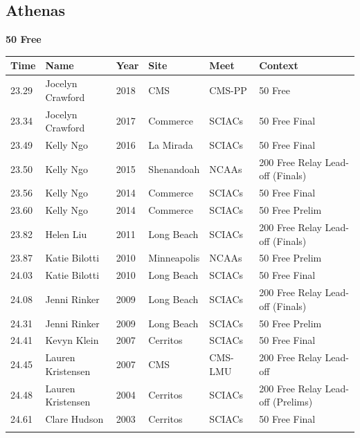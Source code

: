 
\clearpage
{}

\clearpage
\subsection{Athenas}
\vspace{2.0em}
\noindent\begin{minipage}[t]{0.98\textwidth}
\centering
\textbf{\textcolor{teamprimary}{50 Free}}\par
\vspace{0.5em}
\centering
\small
\renewcommand{\arraystretch}{1.0}
\setlength{\tabcolsep}{4pt}
\begin{tabular}{@{}p{2.0cm}p{3.2cm}p{1.2cm}p{2.0cm}p{2.0cm}p{2.5cm}@{}}
\toprule
\textbf{Time} & \textbf{Name} & \textbf{Year} & \textbf{Site} & \textbf{Meet} & \textbf{Context} \\
\midrule
23.29 & Jocelyn Crawford & 2018 & CMS & CMS-PP & 50 Free \\
23.34 & Jocelyn Crawford & 2017 & Commerce & SCIACs & 50 Free Final \\
23.49 & Kelly Ngo & 2016 & La Mirada & SCIACs & 50 Free Final \\
23.50 & Kelly Ngo & 2015 & Shenandoah & NCAAs & 200 Free Relay Lead-off (Finals) \\
23.56 & Kelly Ngo & 2014 & Commerce & SCIACs & 50 Free Final \\
23.60 & Kelly Ngo & 2014 & Commerce & SCIACs & 50 Free Prelim \\
23.82 & Helen Liu & 2011 & Long Beach & SCIACs & 200 Free Relay Lead-off (Finals) \\
23.87 & Katie Bilotti & 2010 & Minneapolis & NCAAs & 50 Free Prelim \\
24.03 & Katie Bilotti & 2010 & Long Beach & SCIACs & 50 Free Final \\
24.08 & Jenni Rinker & 2009 & Long Beach & SCIACs & 200 Free Relay Lead-off (Finals) \\
24.31 & Jenni Rinker & 2009 & Long Beach & SCIACs & 50 Free Prelim \\
24.41 & Kevyn Klein & 2007 & Cerritos & SCIACs & 50 Free Final \\
24.45 & Lauren Kristensen & 2007 & CMS & CMS-LMU & 200 Free Relay Lead-off \\
24.48 & Lauren Kristensen & 2004 & Cerritos & SCIACs & 200 Free Relay Lead-off (Prelims) \\
24.61 & Clare Hudson & 2003 & Cerritos & SCIACs & 50 Free Final \\
\bottomrule
\vspace{0.5em}
\end{tabular}
\end{minipage}
\vspace{1.2em}

